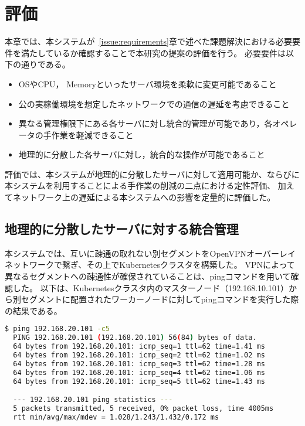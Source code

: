 \chapter{評価}
\label{evaluation}

本章では、本システムが~\ref{issue:requirements}章で述べた課題解決における必要要件を満たしているか確認することで本研究の提案の評価を行う。
必要要件は以下の通りである。
\begin{itemize}
  \item OSやCPU， Memoryといったサーバ環境を柔軟に変更可能であること
  \item 公の実稼働環境を想定したネットワークでの通信の遅延を考慮できること
  \item 異なる管理権限下にある各サーバに対し統合的管理が可能であり，各オペレータの手作業を軽減できること
  \item 地理的に分散した各サーバに対し，統合的な操作が可能であること
\end{itemize}
評価では、本システムが地理的に分散したサーバに対して適用可能か、ならびに本システムを利用することによる手作業の削減の二点における定性評価、
加えてネットワーク上の遅延による本システムへの影響を定量的に評価した。

\section{地理的に分散したサーバに対する統合管理}

本システムでは、互いに疎通の取れない別セグメントをOpenVPNオーバーレイネットワークで繋ぎ、その上でKubernetesクラスタを構築した。
VPNによって異なるセグメントへの疎通性が確保されていることは、pingコマンドを用いて確認した。
以下は、Kubernetesクラスタ内のマスターノード（192.168.10.101）から別セグメントに配置されたワーカーノードに対してpingコマンドを実行した際の結果である。

\begin{lstlisting}[language=bash]
  $ ping 192.168.20.101 -c5
  PING 192.168.20.101 (192.168.20.101) 56(84) bytes of data.
  64 bytes from 192.168.20.101: icmp_seq=1 ttl=62 time=1.41 ms
  64 bytes from 192.168.20.101: icmp_seq=2 ttl=62 time=1.02 ms
  64 bytes from 192.168.20.101: icmp_seq=3 ttl=62 time=1.28 ms
  64 bytes from 192.168.20.101: icmp_seq=4 ttl=62 time=1.06 ms
  64 bytes from 192.168.20.101: icmp_seq=5 ttl=62 time=1.43 ms

  --- 192.168.20.101 ping statistics ---
  5 packets transmitted, 5 received, 0% packet loss, time 4005ms
  rtt min/avg/max/mdev = 1.028/1.243/1.432/0.172 ms
\end{lstlisting}

